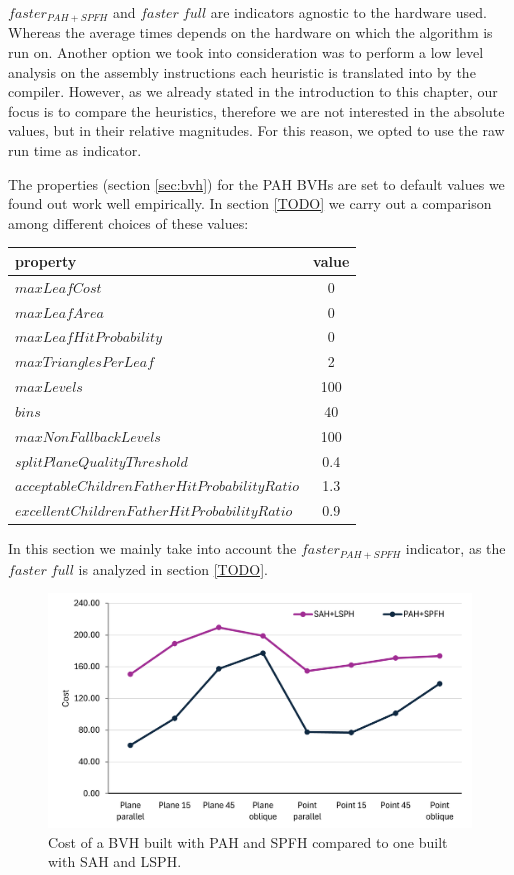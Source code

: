 \documentclass{PoliMi_MasterThesis}
\begin{document}
$faster_{PAH+SPFH}$ and $faster \; full$ are indicators agnostic to the hardware used. Whereas the average times depends on the hardware on which the algorithm is run on. Another option we took into consideration was to perform a low level analysis on the assembly instructions each heuristic is translated into by the compiler. However, as we already stated in the introduction to this chapter, our focus is to compare the heuristics, therefore we are not interested in the absolute values, but in their relative magnitudes. For this reason, we opted to use the raw run time as indicator.

The properties (section \ref{sec:bvh}) for the PAH BVHs are set to default values we found out work well empirically. In section \ref{TODO} we carry out a comparison among different choices of these values:

\begin{table}[H]
	\centering
	\begin{tabular}{| l | c |}
		\hline
		\textbf{property} & \textbf{value}\\
		\hline
		\hline
		$maxLeafCost$ & 0\\
		$maxLeafArea$ & 0\\
		$maxLeafHitProbability$ & 0\\
		$maxTrianglesPerLeaf$ & 2\\
		$maxLevels$ & 100\\
		$bins$ & 40\\
		$maxNonFallbackLevels$ & 100\\
		$splitPlaneQualityThreshold$ & 0.4\\
		$acceptableChildrenFatherHitProbabilityRatio$ & 1.3\\
		$excellentChildrenFatherHitProbabilityRatio$ & 0.9\\
		\hline
	\end{tabular}
	\label{tab:standard_properties}
\end{table}

In this section we mainly take into account the $faster_{PAH+SPFH}$ indicator, as the $faster \; full$ is analyzed in section \ref{TODO}.

\begin{figure}[H] 
	\centering
	\includegraphics[width=\textwidth]{Images/pah_without_fallback_faster_chart.png}
	\caption{Cost of a BVH built with PAH and SPFH compared to one built with SAH and LSPH.}
	\label{fig:pah_without_fallback_faster_chart}
\end{figure}
\end{document}
